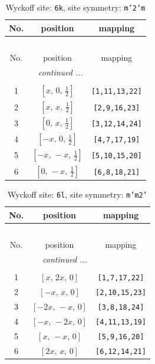 \documentclass[fleqn,8pt]{jsarticle}
\begin{document}
\renewcommand{\arraystretch}{1.2}
\begin{longtable}{ccc}
\caption{Wyckoff site: {\tt 6k}, site symmetry: {\tt m'2'm}}
 \\
 \hline \hline
No. & position & mapping \\ \hline \endfirsthead

\multicolumn{2}{l}{\tablename\ \thetable{}} \\
 \hline \hline
No. & position & mapping \\ \hline \endhead

 \hline \hline
\multicolumn{2}{r}{\footnotesize\it continued ...} \\ \endfoot

 \hline \hline
\multicolumn{2}{r}{} \\ \endlastfoot

1 & $\left[ x,\, 0,\, \frac{1}{2} \right]$ & {\tt [1,11,13,22]} \\ \hline
2 & $\left[ x,\, x,\, \frac{1}{2} \right]$ & {\tt [2,9,16,23]} \\ \hline
3 & $\left[ 0,\, x,\, \frac{1}{2} \right]$ & {\tt [3,12,14,24]} \\ \hline
4 & $\left[ - x,\, 0,\, \frac{1}{2} \right]$ & {\tt [4,7,17,19]} \\ \hline
5 & $\left[ - x,\, - x,\, \frac{1}{2} \right]$ & {\tt [5,10,15,20]} \\ \hline
6 & $\left[ 0,\, - x,\, \frac{1}{2} \right]$ & {\tt [6,8,18,21]} \\
\end{longtable}
\renewcommand{\arraystretch}{1.2}
\begin{longtable}{ccc}
\caption{Wyckoff site: {\tt 6l}, site symmetry: {\tt m'm2'}}
 \\
 \hline \hline
No. & position & mapping \\ \hline \endfirsthead

\multicolumn{2}{l}{\tablename\ \thetable{}} \\
 \hline \hline
No. & position & mapping \\ \hline \endhead

 \hline \hline
\multicolumn{2}{r}{\footnotesize\it continued ...} \\ \endfoot

 \hline \hline
\multicolumn{2}{r}{} \\ \endlastfoot

1 & $\left[ x,\, 2 x,\, 0 \right]$ & {\tt [1,7,17,22]} \\ \hline
2 & $\left[ - x,\, x,\, 0 \right]$ & {\tt [2,10,15,23]} \\ \hline
3 & $\left[ - 2 x,\, - x,\, 0 \right]$ & {\tt [3,8,18,24]} \\ \hline
4 & $\left[ - x,\, - 2 x,\, 0 \right]$ & {\tt [4,11,13,19]} \\ \hline
5 & $\left[ x,\, - x,\, 0 \right]$ & {\tt [5,9,16,20]} \\ \hline
6 & $\left[ 2 x,\, x,\, 0 \right]$ & {\tt [6,12,14,21]} \\
\end{longtable}
\end{document}
